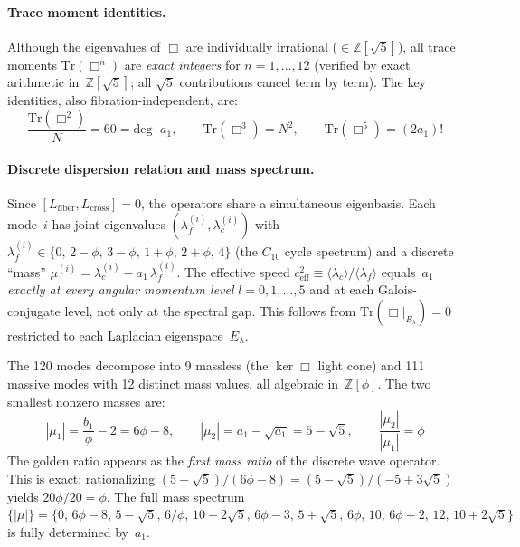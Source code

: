 \documentclass[12pt,a4paper]{article}
\theoremstyle{definition}
\begin{document}
\paragraph{Trace moment identities.}
Although the eigenvalues of $\Box$ are individually irrational ($\in \mathbb{Z}[\sqrt{5}]$), all trace moments $\mathrm{Tr}(\Box^n)$ are \emph{exact integers} for $n = 1, \ldots, 12$ (verified by exact arithmetic in~$\mathbb{Z}[\sqrt{5}]$; all $\sqrt{5}$ contributions cancel term by term).  The key identities, also fibration-independent, are:
\begin{equation}
\frac{\mathrm{Tr}(\Box^2)}{N} = 60 = \mathrm{deg}\cdot a_1, \qquad
\mathrm{Tr}(\Box^3) = N^2, \qquad
\mathrm{Tr}(\Box^5) = (2a_1)!
\label{eq:box_traces}
\end{equation}


\paragraph{Discrete dispersion relation and mass spectrum.}
Since $[L_{\mathrm{fiber}}, L_{\mathrm{cross}}] = 0$, the operators share a simultaneous eigenbasis. Each mode~$i$ has joint eigenvalues $(\lambda_f^{(i)}, \lambda_c^{(i)})$ with $\lambda_f^{(i)} \in \{0,\, 2\!-\!\phi,\, 3\!-\!\phi,\, 1\!+\!\phi,\, 2\!+\!\phi,\, 4\}$ (the $C_{10}$ cycle spectrum) and a discrete ``mass'' $\mu^{(i)} = \lambda_c^{(i)} - a_1\,\lambda_f^{(i)}$.  The effective speed $c_{\mathrm{eff}}^2 \equiv \langle\lambda_c\rangle/\langle\lambda_f\rangle$ equals~$a_1$ \emph{exactly at every angular momentum level} $l = 0, 1, \ldots, 5$ and at each Galois-conjugate level, not only at the spectral gap.  This follows from $\mathrm{Tr}(\Box|_{E_\lambda}) = 0$ restricted to each Laplacian eigenspace~$E_\lambda$.

The 120 modes decompose into 9 massless (the $\ker\Box$ light cone) and 111 massive modes with 12 distinct mass values, all algebraic in~$\mathbb{Z}[\phi]$.  The two smallest nonzero masses are:
\begin{equation}
|\mu_1| = \frac{b_1}{\phi} - 2 = 6\phi - 8, \qquad
|\mu_2| = a_1 - \sqrt{a_1} = 5 - \sqrt{5}, \qquad
\frac{|\mu_2|}{|\mu_1|} = \phi
\label{eq:mass_ratio_phi}
\end{equation}
The golden ratio appears as the \emph{first mass ratio} of the discrete wave operator.  This is exact: rationalizing $(5\!-\!\sqrt{5})/(6\phi\!-\!8) = (5\!-\!\sqrt{5})/({-}5\!+\!3\sqrt{5})$ yields $20\phi/20 = \phi$.  The full mass spectrum $\{|\mu|\} = \{0,\, 6\phi\!-\!8,\, 5\!-\!\sqrt{5},\, 6/\phi,\, 10\!-\!2\sqrt{5},\, 6\phi\!-\!3,\, 5\!+\!\sqrt{5},\, 6\phi,\, 10,\, 6\phi\!+\!2,\, 12,\, 10\!+\!2\sqrt{5}\}$ is fully determined by~$a_1$.
\end{document}
